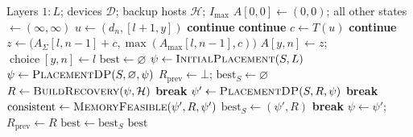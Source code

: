 \documentclass[10pt]{article}
\begin{document}
\clearpage

\begin{algorithm}[H]
  \caption{Recovery-Aware Alternating Layer Placement}
  \label{alg:recovery-aware-dp}
  \begin{algorithmic}[1]
    \Require Layers $1{:}L$; devices $\mathcal{D}$; backup hosts $\mathcal{H}$; $I_{\max}$
    \Statex {}
      \State $A[0,0]\gets(0,0)$; all other states $\gets(\infty,\infty)$
            \State $u\gets(d_n,[l+1,y])$
             \State \textbf{continue} \EndIf
             \State \textbf{continue} \EndIf
            \State $c\gets T(u)$
             \State \textbf{continue} \EndIf
            \State $z\gets\bigl(A_\Sigma[l,n-1]+c,\max(A_{\max}[l,n-1],c)\bigr)$
              \State $A[y,n]\gets z$; $\operatorname{choice}[y,n]\gets l$
            \EndIf
          \EndFor
        \EndFor
      \EndFor
      \State \Return {}
    \EndFunction
    \Statex
    \Statex {}
      \State $\mathrm{best}\gets\varnothing$
        \State $\psi\gets\Call{InitialPlacement}{S,L}$
          \State $\psi\gets\Call{PlacementDP}{S,\varnothing,\psi}$ 
        \EndIf
        \State $R_{\mathrm{prev}}\gets\bot$; $\mathrm{best}_S\gets\varnothing$
          \State $R\gets\Call{BuildRecovery}{\psi,\mathcal{H}}$
           \State \textbf{break} \EndIf
          \State $\psi'\gets\Call{PlacementDP}{S,R,\psi}$
           \State \textbf{break} \EndIf
          \State $\mathrm{consistent}\gets\Call{MemoryFeasible}{\psi',R,\psi'}$
            \State $\mathrm{best}_S\gets(\psi',R)$
          \EndIf
            \State \textbf{break}
          \EndIf
          \State $\psi\gets\psi'$; $R_{\mathrm{prev}}\gets R$
        \EndFor
          \State $\mathrm{best}\gets\mathrm{best}_S$
        \EndIf
      \EndFor
      \State \Return $\mathrm{best}$
    \EndProcedure
  \end{algorithmic}
\end{algorithm}
\end{document}
